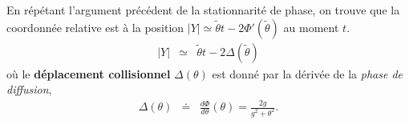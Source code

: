 En répétant l'argument précédent de la stationnarité de phase, on trouve que la coordonnée relative est à la position $\vert Y \vert  \simeq \tilde{\theta} t - 2\Phi'( \tilde{\theta})$ au moment $t$. %
\begin{eqnarray}
	\vert Y \vert & \simeq & 	\tilde{\theta} t  - 2 \Delta (\tilde{\theta} )
\end{eqnarray}
où le {\bf déplacement collisionnel} $\Delta (\theta)$ est donné par la dérivée de la {\em phase de diffusion},
\begin{eqnarray}\label{eq:I-1-16}
	\Delta ( \theta ) & \doteq & \frac{ d \Phi }{ d \theta } ( \theta )= \frac{ 2 g }{ g^2 + \theta^2} . 	
\end{eqnarray}




